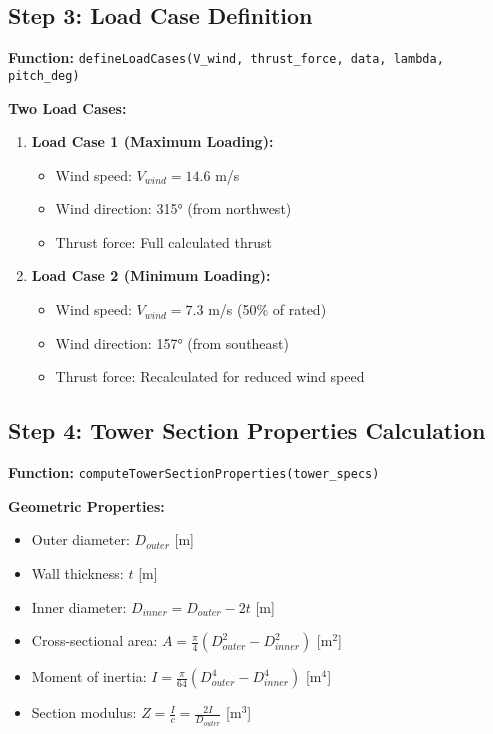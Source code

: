\documentclass[11pt]{article}
\begin{document}
\subsection{Step 3: Load Case Definition}
\textbf{Function:} \texttt{defineLoadCases(V\_wind, thrust\_force, data, lambda, pitch\_deg)}

\textbf{Two Load Cases:}
\begin{enumerate}
    \item \textbf{Load Case 1 (Maximum Loading):}
    \begin{itemize}
        \item Wind speed: $V_{wind} = 14.6$ m/s
        \item Wind direction: 315° (from northwest)
        \item Thrust force: Full calculated thrust
    \end{itemize}
    \item \textbf{Load Case 2 (Minimum Loading):}
    \begin{itemize}
        \item Wind speed: $V_{wind} = 7.3$ m/s (50\% of rated)
        \item Wind direction: 157° (from southeast)
        \item Thrust force: Recalculated for reduced wind speed
    \end{itemize}
\end{enumerate}

\subsection{Step 4: Tower Section Properties Calculation}
\textbf{Function:} \texttt{computeTowerSectionProperties(tower\_specs)}

\textbf{Geometric Properties:}
\begin{itemize}
    \item Outer diameter: $D_{outer}$ [m]
    \item Wall thickness: $t$ [m]
    \item Inner diameter: $D_{inner} = D_{outer} - 2t$ [m]
    \item Cross-sectional area: $A = \frac{\pi}{4}(D_{outer}^2 - D_{inner}^2)$ [m$^2$]
    \item Moment of inertia: $I = \frac{\pi}{64}(D_{outer}^4 - D_{inner}^4)$ [m$^4$]
    \item Section modulus: $Z = \frac{I}{c} = \frac{2I}{D_{outer}}$ [m$^3$]
\end{itemize}
\end{document}
